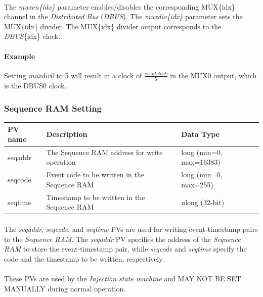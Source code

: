 \documentclass[openany]{article}
\begin{document}
			\paragraph{} The \emph{muxen\{idx\}} parameter enables/disables the corresponding MUX\{idx\} channel in the \emph{Distributed Bus} (\emph{DBUS}). The \emph{muxdiv\{idx\}} parameter sets the MUX\{idx\} divider. The MUX\{idx\} divider output corresponds to the \emph{DBUS}\{idx\} clock.
			\paragraph{Example} Setting \emph{muxdiv0} to 5 will result in a clock of \( \frac{event clock}{5} \) in the MUX0 output, which is the DBUS0 clock.
	 
		\subsubsection{Sequence RAM Setting}\label{pvgroup:evg-seqram-set}
			\begin{center}
			\begin{tabular}{| m{2.8cm} m{6cm} m{6cm} |}
			    \hline
			    \bfseries PV name & \bfseries Description & \bfseries Data Type \\ \hline
			    seqaddr & The Sequence RAM address for write operation & long (min=0, max=16383) \\ \hline
			    seqcode & Event code to be written in the Sequence RAM & long (min=0, max=255) \\ \hline
			    seqtime & Timestamp to be written in the Sequence RAM & ulong (32-bit) \\ \hline
			\end{tabular}
			\end{center}

			\paragraph{} The \emph{seqaddr}, \emph{seqcode}, and \emph{seqtime} PVs are used for writing event-timestamp pairs to the \emph{Sequence RAM}. The \emph{seqaddr} PV specifies the address of the \emph{Sequence RAM} to store the event-timestamp pair, while \emph{seqcode} and \emph{seqtime} specify the code and the timestamp to be written, respectively. 
			\paragraph{} These PVs are used by the \emph{Injection state machine} and MAY NOT BE SET MANUALLY during normal operation.	
\end{document}
